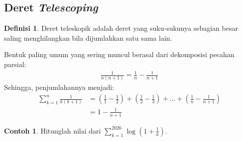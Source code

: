 \documentclass[aspectratio=169]{beamer}
\theoremstyle{definition}
\newtheorem{definisi}{Definisi}
\newtheorem{contoh}{Contoh}
\begin{document}
\subsection{Deret \textit{Telescoping}}
\begin{frame}{\insertsection}{\insertsubsection}
  \begin{definisi}
    Deret teleskopik adalah deret yang suku-sukunya sebagian besar saling menghilangkan bila dijumlahkan satu sama lain.
  \end{definisi}
  Bentuk paling umum yang sering muncul berasal dari dekomposisi pecahan parsial:
  \begin{align*}
    \frac{1}{n(n+1)} = \frac{1}{n} - \frac{1}{n+1}
  \end{align*}
  Sehingga, penjumlahannya menjadi:
  \begin{align*}
    \sum_{k=1}^n \frac{1}{k(k+1)} & = \left(\frac{1}{1} - \frac{1}{2}\right) + \left(\frac{1}{2} - \frac{1}{3}\right) + \dots + \left(\frac{1}{n} - \frac{1}{n+1}\right) \\
                                  & = 1 - \frac{1}{n+1}
  \end{align*}
\end{frame}

\begin{frame}{\insertsection}{\insertsubsection}
  \begin{contoh}
    Hitunglah nilai dari $\displaystyle\sum_{k=1}^{2026} \log\left(1 + \frac{1}{k}\right)$.

  \end{contoh}
\end{frame}
\end{document}
